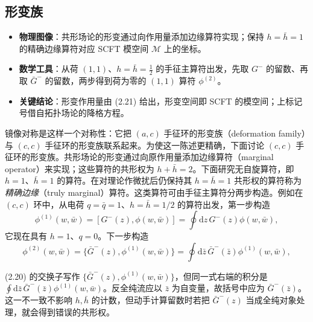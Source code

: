\subsection{形变族}
\label{sec:2.3}

\begin{keytakeaways}
  \begin{itemize}[leftmargin=1.4em,itemsep=2pt,topsep=2pt]
    \item \textbf{物理图像}：共形场论的形变通过向作用量添加边缘算符实现；保持 $h=\bar h=1$ 的精确边缘算符对应 SCFT 模空间 $\mathcal{M}$ 上的坐标。
    \item \textbf{数学工具}：从荷 $(1,1)$、$h=\bar h=\frac{1}{2}$ 的手征主算符出发，先取 $G^{-}$ 的留数、再取 $\bar G^{-}$ 的留数，两步得到荷为零的 $(1,1)$ 算符 $\phi^{(2)}$。
    \item \textbf{关键结论}：形变作用量由 (2.21) 给出，形变空间即 SCFT 的模空间；上标记号借自拓扑场论的降格方程。
  \end{itemize}
\end{keytakeaways}

镜像对称是这样一个对称性：它把 $(a,c)$ 手征环的形变族（deformation family）与 $(c,c)$ 手征环的形变族联系起来。为使这一陈述更精确，下面讨论 $(c,c)$ 手征环的形变族。共形场论的形变通过向原作用量添加边缘算符（marginal operator）来实现；这些算符的共形权为 $h+\bar h=2$。下面研究无自旋算符，即 $h=1$、$\bar h=1$ 的算符。在对理论作微扰后仍保持其 $h=\bar h=1$ 共形权的算符称为\emph{精确边缘}（truly marginal）算符。这类算符可由手征主算符分两步构造。例如在 $(c,c)$ 环中，从电荷 $q=\bar q=1$、$h=\bar h=1/2$ 的算符出发，第一步构造
\begin{equation}\tag{2.19}
\phi^{(1)}(w,\bar w)=[G^{-}(z),\phi(w,\bar w)]=\oint\mathrm{d}z\,G^{-}(z)\phi(w,\bar w),
\end{equation}
它现在具有 $h=1$、$q=0$。下一步构造
\begin{equation}\tag{2.20}
\phi^{(2)}(w,\bar w)=\{\bar G^{-}(z),\phi^{(1)}(w,\bar w)\}=\oint\mathrm{d}\bar z\,\bar G^{-}(\bar z)\phi^{(1)}(w,\bar w),
\end{equation}

\begin{yizhu}[原文疑误]
(2.20) 的交换子写作 $\{\bar G^{-}(z),\phi^{(1)}(w,\bar w)\}$，但同一式右端的积分是 $\oint\mathrm{d}\bar z\,\bar G^{-}(\bar z)\phi^{(1)}(w,\bar w)$。反全纯流应以 $\bar z$ 为自变量，故括号中应为 $\bar G^{-}(\bar z)$。这一不一致不影响 $h,\bar h$ 的计数，但动手计算留数时若把 $\bar G^{-}(z)$ 当成全纯对象处理，就会得到错误的共形权。
\end{yizhu}

